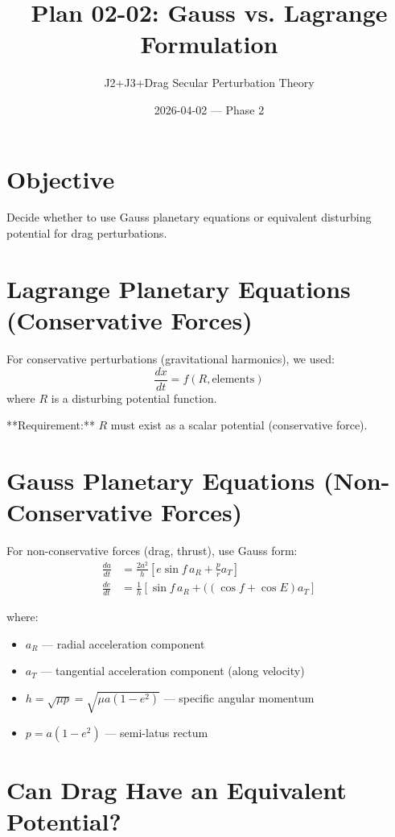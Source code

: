 \documentclass[11pt]{article}
\title{Plan 02-02: Gauss vs. Lagrange Formulation}
\author{J2+J3+Drag Secular Perturbation Theory}
\date{2026-04-02 — Phase 2}
\begin{document}
\maketitle

\section{Objective}
Decide whether to use Gauss planetary equations or equivalent disturbing potential for drag perturbations.

\section{Lagrange Planetary Equations (Conservative Forces)}

For conservative perturbations (gravitational harmonics), we used:
\begin{equation}
\frac{dx}{dt} = f(R, \text{elements})
\end{equation}
where $R$ is a disturbing potential function.

**Requirement:** $R$ must exist as a scalar potential (conservative force).

\section{Gauss Planetary Equations (Non-Conservative Forces)}

For non-conservative forces (drag, thrust), use Gauss form:
\begin{align}
\frac{da}{dt} &= \frac{2a^2}{h}\left[e\sin f\, a_R + \frac{p}{r} a_T\right]\\
\frac{de}{dt} &= \frac{1}{h}\left[\sin f\, a_R + ((\cos f + \cos E) a_T\right]
\end{align}

where:
\begin{itemize}
    \item $a_R$ — radial acceleration component
    \item $a_T$ — tangential acceleration component (along velocity)
    \item $h = \sqrt{\mu p} = \sqrt{\mu a(1-e^2)}$ — specific angular momentum
    \item $p = a(1-e^2)$ — semi-latus rectum
\end{itemize}

\section{Can Drag Have an Equivalent Potential?}
\end{document}
